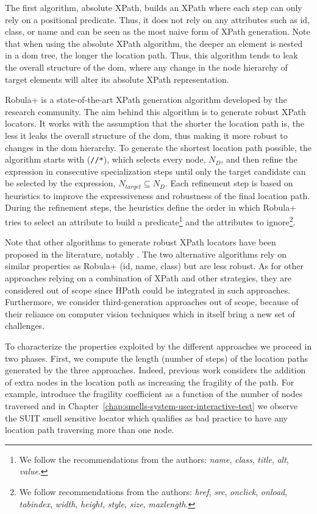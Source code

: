 The first algorithm, absolute XPath, builds an XPath where each step can only rely on a positional predicate. Thus, it does not rely on any attributes such as id, class, or name and can be seen as the most naive form of XPath generation. Note that when using the absolute XPath algorithm, the deeper an element is nested in a \gls{dom} tree, the longer the location path. Thus, this algorithm tends to leak the overall structure of the \gls{dom}, where any change in the node hierarchy of target elements will alter its absolute XPath representation.

Robula+ \cite{Leotta2016} is a state-of-the-art XPath generation algorithm developed by the research community. The aim behind this algorithm is to generate robust XPath locators. It works with the assumption that the shorter the location path is, the less it leaks the overall structure of the \gls{dom}, thus making it more robust to changes in the \gls{dom} hierarchy. To generate the shortest location path possible, the algorithm starts with (\texttt{//*}), which selects every node, $N_D$, and then refine the expression in consecutive specialization steps until only the target candidate can be selected by the expression, $N_{target} \subseteq N_D$. Each refinement step is based on heuristics to improve the expressiveness and robustness of the final location path. During the refinement steps, the heuristics define the order in which Robula+ tries to select an attribute to build a predicate\footnote{We follow the recommendations from the authors: \emph{name}, \emph{class}, \emph{title}, \emph{alt}, \emph{value}.} and the attributes to ignore\footnote{We follow recommendations from the authors: \emph{href}, \emph{src}, \emph{onclick}, \emph{onload}, \emph{tabindex}, \emph{width}, \emph{height}, \emph{style}, \emph{size}, \emph{maxlength}.}.

Note that other algorithms to generate robust XPath locators have been proposed in the literature, notably \textcite{Montoto2011, Thummalapenta2013}. The two alternative algorithms rely on similar properties as Robula+ (id, name, class) but are less robust\cite{Leotta2016}. As for other approaches relying on a combination of XPath and other strategies\cite{Leotta2015, Aldalur2017}, they are considered out of scope since HPath could be integrated in such approaches. Furthermore, we consider third-generation approaches out of scope, because of their reliance on computer vision techniques which in itself bring a new set of challenges.

To characterize the properties exploited by the different approaches we proceed in two phases. First, we compute the length (number of steps) of the location paths generated by the three approaches. Indeed, previous work considers the addition of extra nodes in the location path as increasing the fragility of the path. For example, \textcite{Leotta2015} introduce the fragility coefficient as a function of the number of nodes traversed and in Chapter~\ref{chap:smells-system-user-interactive-test} we observe the SUIT smell sensitive locator which qualifies as bad practice to have any location path traversing more than one node.

